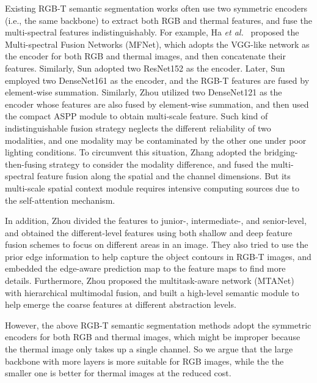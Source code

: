 \documentclass[10.5pt,twocolumn,journal,letterpaper]{IEEEtran}
\newcommand{\ie}{i.e.}
\newcommand{\etal}{\textit{et al.}}
\begin{document}
Existing RGB-T semantic segmentation works \cite{ha-iros2017-mfnet, sun-ral2019-rtfnet, sun-tase2021-fuseseg} often use two symmetric encoders (\ie, the same backbone) to extract both RGB and thermal features, and fuse the multi-spectral features indistinguishably. For example, Ha \etal~\cite{ha-iros2017-mfnet} proposed the Multi-spectral Fusion Networks (MFNet), which adopts the VGG-like network \cite{simonyan-arxiv2014-vgg} as the encoder for both RGB and thermal images, and then concatenate their features. Similarly, Sun \cite{sun-ral2019-rtfnet} adopted two ResNet152 \cite{he-cvpr2016-resnet} as the encoder. Later, Sun \cite{sun-tase2021-fuseseg} employed two DenseNet161 \cite{huang-cvpr2017-densenet} as the encoder, and the RGB-T features are fused by element-wise summation. Similarly, Zhou \cite{zhou-tmm2021-mffenet} utilized two DenseNet121 as the encoder whose features are also fused by element-wise summation, and then used the compact ASPP \cite{chen-eccv2018-deeplabv3+} module to obtain multi-scale feature. Such kind of indistinguishable fusion strategy neglects the different reliability of two modalities, and one modality may be contaminated by the other one under poor lighting conditions. To circumvent this situation, Zhang \cite{zhang-cvpr2021-abmdrnet} adopted the bridging-then-fusing strategy to consider the modality difference, and fused the multi-spectral feature fusion along the spatial and the channel dimensions. But its multi-scale spatial context module requires intensive computing sources due to the self-attention mechanism.

In addition, Zhou \cite{zhou-tip2021-gmnet} divided the features to junior-, intermediate-, and senior-level, and obtained the different-level features using both shallow and deep feature fusion schemes to focus on different areas in an image. They \cite{zhou-aaai2022-egfnet} also tried to use the prior edge information to help capture the object contours in RGB-T images, and embedded the edge-aware prediction map to the feature maps to find more details. Furthermore, Zhou \cite{zhou-tiv2022-mtanet} proposed the multitask-aware network (MTANet) with hierarchical multimodal fusion, and built a high-level semantic module to help emerge the coarse features at different abstraction levels. 

However, the above RGB-T semantic segmentation methods adopt the symmetric encoders for both RGB and thermal images, which might be improper because the thermal image only takes up a single channel. So we argue that the large backbone with more layers is more suitable for RGB images, while the the smaller one is better for thermal images at the reduced cost.
\end{document}
